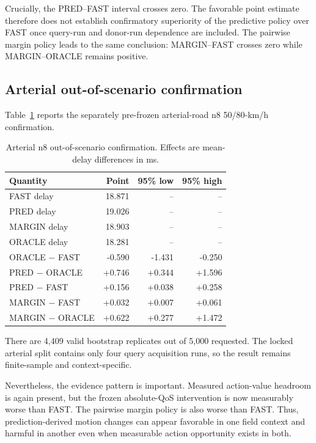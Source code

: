 \documentclass[journal]{IEEEtran}
\begin{document}
Crucially, the PRED--FAST interval crosses zero. The favorable point estimate therefore does not establish confirmatory superiority of the predictive policy over FAST once query-run and donor-run dependence are included. The pairwise margin policy leads to the same conclusion: MARGIN--FAST crosses zero while MARGIN--ORACLE remains positive.

\subsection{Arterial out-of-scenario confirmation}
Table~\ref{tab:arterial} reports the separately pre-frozen arterial-road n8 50/80-km/h confirmation.

\begin{table}[t]
\caption{Arterial n8 out-of-scenario confirmation. Effects are mean-delay differences in ms.}
\label{tab:arterial}
\centering
\small
\begin{tabular}{lrrr}
\toprule
Quantity & Point & 95\% low & 95\% high \\
\midrule
FAST delay & 18.871 & -- & -- \\
PRED delay & 19.026 & -- & -- \\
MARGIN delay & 18.903 & -- & -- \\
ORACLE delay & 18.281 & -- & -- \\
\midrule
ORACLE $-$ FAST & -0.590 & -1.431 & -0.250 \\
PRED $-$ ORACLE & +0.746 & +0.344 & +1.596 \\
PRED $-$ FAST & +0.156 & +0.038 & +0.258 \\
MARGIN $-$ FAST & +0.032 & +0.007 & +0.061 \\
MARGIN $-$ ORACLE & +0.622 & +0.277 & +1.472 \\
\bottomrule
\end{tabular}
\end{table}

There are 4,409 valid bootstrap replicates out of 5,000 requested. The locked arterial split contains only four query acquisition runs, so the result remains finite-sample and context-specific.

Nevertheless, the evidence pattern is important. Measured action-value headroom is again present, but the frozen absolute-QoS intervention is now measurably worse than FAST. The pairwise margin policy is also worse than FAST. Thus, prediction-derived motion changes can appear favorable in one field context and harmful in another even when measurable action opportunity exists in both.
\end{document}

